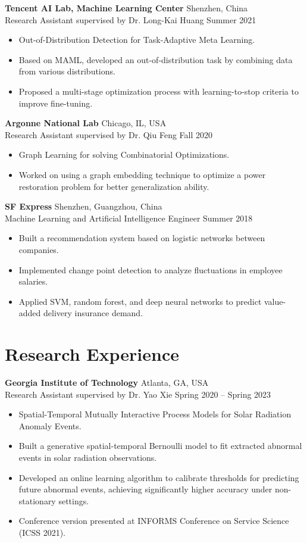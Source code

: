 \documentclass[10pt,letterpaper]{article}
\newcommand{\entry}[4]{%
  \noindent\hspace{1.2em}\begin{minipage}[t]{\dimexpr\textwidth-1.2em\relax}
    \textbf{#1} \hfill #2 \\
    #3 \hfill #4
  \end{minipage}\par\vspace{0.1em}
}
\newenvironment{cvitems}{%
  \begin{itemize}[leftmargin=2.8em,label=--,topsep=1pt,itemsep=1pt,parsep=0pt]
}{%
  \end{itemize}\vspace{0.2em}
}
\begin{document}
\entry{Tencent AI Lab, Machine Learning Center}{Shenzhen, China}{Research Assistant supervised by Dr. Long-Kai Huang}{Summer 2021}
\begin{cvitems}
  \item Out-of-Distribution Detection for Task-Adaptive Meta Learning.
  \item Based on MAML, developed an out-of-distribution task by combining data from various distributions.
  \item Proposed a multi-stage optimization process with learning-to-stop criteria to improve fine-tuning.
\end{cvitems}

\entry{Argonne National Lab}{Chicago, IL, USA}{Research Assistant supervised by Dr. Qiu Feng}{Fall 2020}
\begin{cvitems}
  \item Graph Learning for solving Combinatorial Optimizations.
  \item Worked on using a graph embedding technique to optimize a power restoration problem for better generalization ability.
\end{cvitems}

\entry{SF Express}{Shenzhen, Guangzhou, China}{Machine Learning and Artificial Intelligence Engineer}{Summer 2018}
\begin{cvitems}
  \item Built a recommendation system based on logistic networks between companies.
  \item Implemented change point detection to analyze fluctuations in employee salaries.
  \item Applied SVM, random forest, and deep neural networks to predict value-added delivery insurance demand.
\end{cvitems}

\section{Research Experience}

\entry{Georgia Institute of Technology}{Atlanta, GA, USA}{Research Assistant supervised by Dr. Yao Xie}{Spring 2020 -- Spring 2023}
\begin{cvitems}
  \item Spatial-Temporal Mutually Interactive Process Models for Solar Radiation Anomaly Events.
  \item Built a generative spatial-temporal Bernoulli model to fit extracted abnormal events in solar radiation observations.
  \item Developed an online learning algorithm to calibrate thresholds for predicting future abnormal events, achieving significantly higher accuracy under non-stationary settings.
  \item Conference version presented at INFORMS Conference on Service Science (ICSS 2021).
\end{cvitems}
\end{document}
